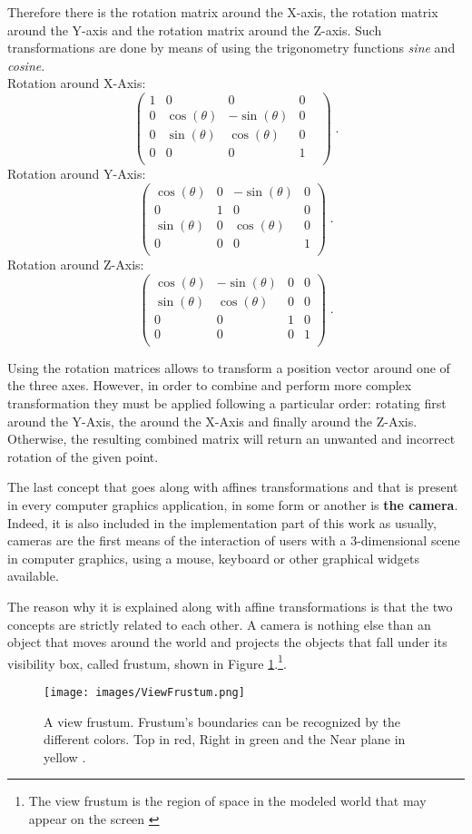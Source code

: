 \documentclass[12pt,a4paper]{extarticle}
\newcommand{\linespace}{\vspace{0pt}}
\begin{document}
Therefore there is the rotation matrix around the X-axis, the rotation matrix around the Y-axis and the rotation matrix around the Z-axis. Such transformations are done by means of using the trigonometry functions \textit{sine} and \textit{cosine}.\\
Rotation around X-Axis:
\[
\begin{pmatrix}
1&0&0&0&\\
0&\cos(\theta)& -\sin(\theta) & 0\\
0&\sin(\theta)&\cos(\theta)&0\\
0&0&0&1\\
\end{pmatrix}
\;.
\] 
Rotation around Y-Axis:
\[
\begin{pmatrix}
\cos(\theta) & 0 &-\sin(\theta)& 0\\
0&1&0&0\\
\sin(\theta)&0&\cos(\theta)&0\\
0&0&0&1\\
\end{pmatrix}
\;.
\]
Rotation around Z-Axis:
\[
\begin{pmatrix}
\cos(\theta)& -\sin(\theta) & 0 & 0\\
\sin(\theta)&\cos(\theta)&0&0\\
0&0&1&0\\
0&0&0&1\\
\end{pmatrix}
\;.
\]


Using the rotation matrices allows to transform a position vector around one of the three axes. However, in order to combine and perform more complex transformation they must be applied following a particular order: rotating first around the Y-Axis, the around the X-Axis and finally around the Z-Axis. Otherwise, the resulting combined matrix will return an unwanted and incorrect rotation of the given point.
\linespace

The last concept that goes along with affines transformations and that is present in every computer graphics application, in some form or another is \textbf{the camera}. Indeed, it is also included in the implementation part of this work as usually, cameras are the first means of the interaction of users with a 3-dimensional scene in computer graphics, using a mouse, keyboard or other graphical widgets available.
\linespace

The reason why it is explained along with affine transformations is that the two concepts are strictly related to each other. A camera is nothing else than an object that moves around the world and projects the objects that fall under its visibility box, called frustum, shown in Figure \ref{fig:viewfrustum}.\footnote{The view frustum is the region of space in the modeled world that may appear on the screen \cite{wiki_frustum:1}}.
\begin{figure}[hbtp]
\centering
\texttt{[image: images/ViewFrustum.png]}
\caption{A view frustum. Frustum's boundaries can be recognized by the different colors. Top in red, Right in green and the Near plane in yellow \cite{wiki_frustum:1}.}
\label{fig:viewfrustum}
\end{figure}
\end{document}
